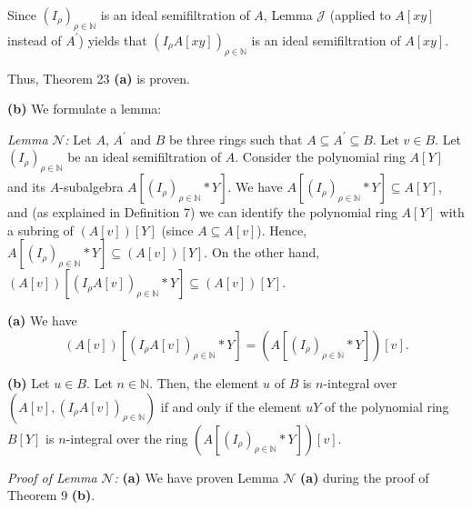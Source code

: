 \documentclass[12pt,final,notitlepage,onecolumn]{article}%
\begin{document}
Since $\left(  I_{\rho}\right)  _{\rho\in\mathbb{N}}$ is an ideal
semifiltration of $A$, Lemma $\mathcal{J}$ (applied to $A\left[  xy\right]  $
instead of $A^{\prime}$) yields that $\left(  I_{\rho}A\left[  xy\right]
\right)  _{\rho\in\mathbb{N}}$ is an ideal semifiltration of $A\left[
xy\right]  $.

Thus, Theorem 23 \textbf{(a)} is proven.

\textbf{(b)} We formulate a lemma:

\textit{Lemma} $\mathcal{N}$\textit{:} Let $A$, $A^{\prime}$ and $B$ be three
rings such that $A\subseteq A^{\prime}\subseteq B$. Let $v\in B$. Let $\left(
I_{\rho}\right)  _{\rho\in\mathbb{N}}$ be an ideal semifiltration of $A$.
Consider the polynomial ring $A\left[  Y\right]  $ and its $A$-subalgebra
$A\left[  \left(  I_{\rho}\right)  _{\rho\in\mathbb{N}}\ast Y\right]  $. We
have $A\left[  \left(  I_{\rho}\right)  _{\rho\in\mathbb{N}}\ast Y\right]
\subseteq A\left[  Y\right]  $, and (as explained in Definition 7) we can
identify the polynomial ring $A\left[  Y\right]  $ with a subring of $\left(
A\left[  v\right]  \right)  \left[  Y\right]  $ (since $A\subseteq A\left[
v\right]  $). Hence, $A\left[  \left(  I_{\rho}\right)  _{\rho\in\mathbb{N}%
}\ast Y\right]  \subseteq\left(  A\left[  v\right]  \right)  \left[  Y\right]
$. On the other hand, $\left(  A\left[  v\right]  \right)  \left[  \left(
I_{\rho}A\left[  v\right]  \right)  _{\rho\in\mathbb{N}}\ast Y\right]
\subseteq\left(  A\left[  v\right]  \right)  \left[  Y\right]  $.

\textbf{(a)} We have%
\[
\left(  A\left[  v\right]  \right)  \left[  \left(  I_{\rho}A\left[  v\right]
\right)  _{\rho\in\mathbb{N}}\ast Y\right]  =\left(  A\left[  \left(  I_{\rho
}\right)  _{\rho\in\mathbb{N}}\ast Y\right]  \right)  \left[  v\right]  .
\]


\textbf{(b)} Let $u\in B$. Let $n\in\mathbb{N}$. Then, the element $u$ of $B$
is $n$-integral over $\left(  A\left[  v\right]  ,\left(  I_{\rho}A\left[
v\right]  \right)  _{\rho\in\mathbb{N}}\right)  $ if and only if the element
$uY$ of the polynomial ring $B\left[  Y\right]  $ is $n$-integral over the
ring $\left(  A\left[  \left(  I_{\rho}\right)  _{\rho\in\mathbb{N}}\ast
Y\right]  \right)  \left[  v\right]  $.

\textit{Proof of Lemma }$\mathcal{N}$\textit{:} \textbf{(a)} We have proven
Lemma $\mathcal{N}$ \textbf{(a)} during the proof of Theorem 9 \textbf{(b)}.
\end{document}
